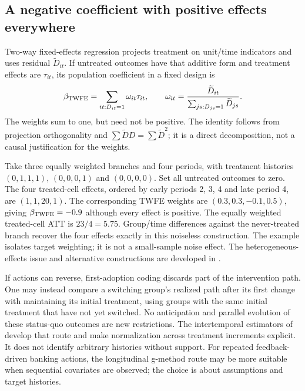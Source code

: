 \subsection{A negative coefficient with positive effects everywhere}
Two-way fixed-effects regression projects treatment on unit/time
indicators and uses residual $\widetilde D_{it}$. If untreated outcomes
have that additive form and treatment effects are $\tau_{it}$, its
population coefficient in a fixed design is
\begin{equation}
 \beta_{\rm TWFE}
 =\sum_{it:D_{it}=1}\omega_{it}\tau_{it},\qquad
 \omega_{it}=\frac{\widetilde D_{it}}
 {\sum_{js:D_{js}=1}\widetilde D_{js}}.
 \label{r3:twfe-weights}
\end{equation}
The weights sum to one, but need not be positive. The identity follows
from projection orthogonality and
$\sum\widetilde D D=\sum\widetilde D^2$; it is a direct
decomposition, not a causal justification for the weights.

Take three equally weighted branches and four periods, with treatment
histories $(0,1,1,1)$, $(0,0,0,1)$ and $(0,0,0,0)$. Set all
untreated outcomes to zero. The four treated-cell effects, ordered by
early periods 2, 3, 4 and late period 4, are $(1,1,20,1)$.
The corresponding TWFE weights are $(0.3,0.3,-0.1,0.5)$, giving
$\beta_{\rm TWFE}=-0.9$ although every effect is positive.
The equally weighted treated-cell ATT is $23/4=5.75$.
Group/time differences against the never-treated branch recover the
four effects exactly in this noiseless construction. The example
isolates target weighting; it is not a small-sample noise effect.
The heterogeneous-effects issue and alternative constructions are
developed in \citet{callaway2021,panelreview2024}.

If actions can reverse, first-adoption coding discards part of the
intervention path. One may instead compare a switching group's
realized path after its first change with maintaining its initial
treatment, using groups with the same initial treatment that have not
yet switched. No anticipation and parallel evolution of these
status-quo outcomes are new restrictions. The intertemporal estimators
of \citet[Assumptions 1--2 and Section 3]{dechaisemartin2024} develop
that route and make normalization across treatment increments explicit.
It does not identify arbitrary histories without support. For repeated
feedback-driven banking actions, the longitudinal g-method route may
be more suitable when sequential covariates are observed; the choice
is about assumptions and target histories.

